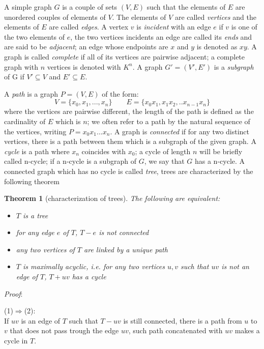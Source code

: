 \documentclass[a4paper,12pt,oneside]{book}
\newtheorem{theorem}{Theorem}[chapter]
\begin{document}
A simple graph $G$ is a couple of sets $(V,E)$ such that the elements of $E$ are unordered couples of elements of $V$. The elements of $V$ are called \textit{vertices} and the elements of $E$ are called \textit{edges}. A vertex $v$ is \textit{incident} with an edge $e$ if $v$ is one of the two elements of $e$, the two vertices incidents an edge are called its \textit{ends} and are said to be \textit{adjacent}; an edge whose endpoints are $x$ and $y$ is denoted as $xy$. A graph is called  \textit{complete} if all of its vertices are pairwise adjacent; a complete graph with $n$ vertices is denoted with $K^n$.
A graph $G'=(V',E')$ is a \textit{subgraph} of G if $V' \subseteq V$ and $E' \subseteq E$.

A \textit{path} is a graph $P=(V,E)$ of the form:
$$ V=\{x_0,x_1, ..., x_n\} \qquad E=\{x_0 x_1, x_1x_2,.. x_{n-1}x_n\}$$ 
where the vertices are pairwise different, the length of the path is defined as the cardinality of $E$ which is $n$; we often refer to a path by the natural sequence of the vertices, writing $P=x_0x_1...x_n$. A graph is \textit{connected} if for any two distinct vertices, there is a path between them which is a subgraph of the given graph.  
A \textit{cycle} is a path where $x_n$ coincides with $x_0$; a cycle of length $n$ will be briefly called n-cycle; if a n-cycle is a subgraph of $G$, we say that $G$ has a n-cycle. 
 A connected graph which has no cycle is called \textit{tree}, trees are characterized by the following theorem 

\begin{theorem}[characterization of trees] The following are equivalent:
\begin{itemize}
\item[(1)] $T$ is a tree
\item[(2)] for any edge $e$ of $T$, $T-e$ is not connected   
\item[(3)] any two vertices of $T$ are linked by a unique path
\item[(4)] $T$ is maximally acyclic, i.e. for any two vertices $u,v$ such that $uv$ is not an edge of $T$, $T+uv$ has a cycle
\end{itemize}
\end{theorem}
\noindent\textit{Proof}: 

(1)$\Rightarrow$(2):\\
If $uv$ is an edge of $T$ such that $T-uv$ is still connected, there is a path from $u$ to $v$ that does not pass trough the edge $uv$, such path concatenated with $uv$ makes a cycle in $T$.
\end{document}
